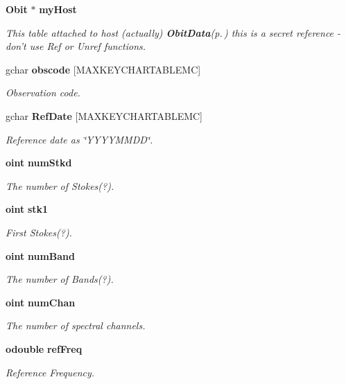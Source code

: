 \begin{CompactItemize}
{\bf Obit} $\ast$ {\bf my\-Host}
\begin{CompactList}\small\item\em This table attached to host (actually) {\bf Obit\-Data}{\rm (p.\,\pageref{structObitData})} this is a secret reference - don't use Ref or Unref functions. \item\end{CompactList}\item 
gchar {\bf obscode} [MAXKEYCHARTABLEMC]
\begin{CompactList}\small\item\em Observation code. \item\end{CompactList}\item 
gchar {\bf Ref\-Date} [MAXKEYCHARTABLEMC]
\begin{CompactList}\small\item\em Reference date as \char`\"{}YYYYMMDD\char`\"{}. \item\end{CompactList}\item 
{\bf oint} {\bf num\-Stkd}
\begin{CompactList}\small\item\em The number of Stokes(?). \item\end{CompactList}\item 
{\bf oint} {\bf stk1}
\begin{CompactList}\small\item\em First Stokes(?). \item\end{CompactList}\item 
{\bf oint} {\bf num\-Band}
\begin{CompactList}\small\item\em The number of Bands(?). \item\end{CompactList}\item 
{\bf oint} {\bf num\-Chan}
\begin{CompactList}\small\item\em The number of spectral channels. \item\end{CompactList}\item 
{\bf odouble} {\bf ref\-Freq}
\begin{CompactList}\small\item\em Reference Frequency. \item\end{CompactList}\item 

\end{CompactItemize}
